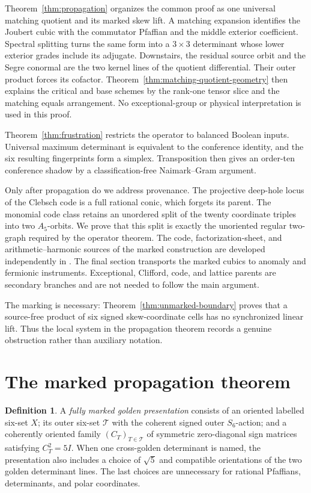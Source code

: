 \documentclass[11pt]{article}
\theoremstyle{definition}
\newtheorem{definition}[theorem]{Definition}
\theoremstyle{remark}
\newcommand{\cT}{\mathcal T}
\begin{document}
Theorem~\ref{thm:propagation} organizes the common proof as one universal
matching quotient and its marked skew lift.  A matching expansion identifies
the Joubert cubic with the commutator Pfaffian and the middle exterior
coefficient.  Spectral splitting turns the same form into a
\(3\times3\) determinant whose lower exterior grades include its adjugate.
Downstairs, the residual source orbit and the Segre conormal are the two
kernel lines of the quotient differential.  Their outer product forces its
cofactor.  Theorem~\ref{thm:matching-quotient-geometry} then explains the
critical and base schemes by the rank-one tensor slice and the matching
equals arrangement.  No exceptional-group or physical interpretation is
used in this proof.

Theorem~\ref{thm:frustration} restricts the operator to balanced Boolean
inputs.  Universal maximum determinant is equivalent to the conference
identity, and the six resulting fingerprints form a simplex.  Transposition
then gives an order-ten conference shadow by a
classification-free Naimark--Gram argument.

Only after propagation do we address provenance.  The projective
deep-hole locus of the Clebsch code is a full rational conic, which forgets
its parent.  The monomial code class retains an unordered split of the
twenty coordinate triples into two \(A_5\)-orbits.  We prove that this split
is exactly the unoriented regular two-graph required by the operator
theorem.  The code, factorization-sheet, and arithmetic--harmonic sources
of the marked construction are developed independently in
\cite{RuddRigidity,RuddFactorization,RuddPassages}.  The final section
transports the marked cubics to anomaly and
fermionic instruments.  Exceptional, Clifford, code, and lattice parents
are secondary branches and are not needed to follow the main argument.

The marking is necessary: Theorem~\ref{thm:unmarked-boundary} proves that a
source-free product of six signed skew-coordinate cells has no synchronized
linear lift.  Thus the local system in the propagation theorem records a
genuine obstruction rather than auxiliary notation.

\section{The marked propagation theorem}

\begin{definition}
A \emph{fully marked golden presentation} consists of an oriented labelled
six-set \(X\); its outer six-set \(\cT\) with the coherent signed outer
\(S_6\)-action; and a coherently oriented family
\((C_T)_{T\in\cT}\) of symmetric zero-diagonal sign matrices satisfying
\(C_T^2=5I\).  When one cross-golden determinant is named, the presentation
also includes a choice of \(\sqrt5\) and compatible orientations of the two
golden determinant lines.  The last choices are unnecessary for rational
Pfaffians, determinants, and polar coordinates.
\end{definition}
\end{document}
